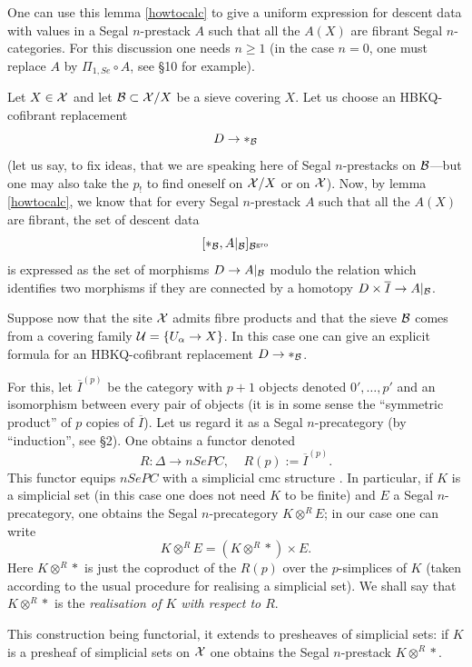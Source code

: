 
One can use this lemma \ref{howtocalc} to give a uniform expression for
descent data with values in a Segal $n$-prestack $A$ such that all the $A(X)$
are fibrant Segal $n$-categories. For this discussion one needs $n\geq 1$ (in
the case $n=0$, one must replace $A$ by $\Pi _{1,Se}\circ A$, see \S10 for
example).

Let $X\in {\cal X}$ and let ${\cal B} \subset {\cal X} /X$ be a sieve covering $X$. Let us
choose an HBKQ-cofibrant replacement
$$
D\rightarrow \ast _{{\cal B}}
$$
(let us say, to fix ideas, that we are speaking here of Segal $n$-prestacks
on ${\cal B}$---but one may also take the $p_!$ to find oneself on ${\cal X} /X$ or on
${\cal X}$). Now, by lemma \ref{howtocalc}, we know that for every Segal
$n$-prestack $A$ such that all the $A(X)$ are fibrant, the set of descent data
$$
[\ast _{{\cal B}}, A|_{{\cal B}}]_{{\cal B} ^{\rm gro}}
$$
is expressed as the set of morphisms $D\rightarrow A|_{{\cal B}}$ modulo the
relation which identifies two morphisms if they are connected by a homotopy
$D\times \overline{I}\rightarrow A|_{{\cal B}}$.

Suppose now that the site ${\cal X}$ admits fibre products and that the sieve
${\cal B}$ comes from a covering family ${\cal U} = \{ U_{\alpha }\rightarrow X\}$. In
this case one can give an explicit formula for an HBKQ-cofibrant replacement
$D\rightarrow \ast _{{\cal B}}$.

For this, let $\overline{I}^{(p)}$ be the category with $p+1$ objects denoted
$0',\ldots , p'$ and an isomorphism between every pair of objects (it is in
some sense the ``symmetric product'' of $p$ copies of $\overline{I}$). Let us
regard it as a Segal $n$-precategory (by ``induction'', see \S2). One obtains
a functor denoted
$$
R: \Delta \rightarrow nSePC,\;\;\;\;
R(p):= \overline{I}^{(p)}.
$$
This functor equips $nSePC$ with a simplicial cmc structure \cite{Quillen}. In
particular, if $K$ is a simplicial set (in this case one does not need $K$ to
be finite) and $E$ a Segal $n$-precategory, one obtains the Segal
$n$-precategory $K\otimes ^RE$; in our case one can write
$$
K\otimes ^R E = (K\otimes ^R\ast )\times E.
$$
Here $K\otimes ^R\ast$ is just the coproduct of the $R(p)$ over the
$p$-simplices of $K$ (taken according to the usual procedure for realising a
simplicial set). We shall say that $K\otimes ^R\ast$ is the \emph{realisation
of $K$ with respect to $R$}.

This construction being functorial, it extends to presheaves of simplicial
sets: if $K$ is a presheaf of simplicial sets on ${\cal X}$ one obtains the Segal
$n$-prestack $K\otimes ^R\ast$.

